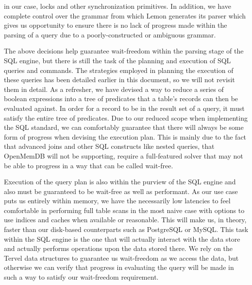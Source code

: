 \documentclass[letterpaper, 12pt]{article}
\begin{document}
  in our case, locks and other synchronization primitives. In addition, we have complete control over
  the grammar from which Lemon generates its parser which gives us opportunity to ensure there
  is no lack of progress made within the parsing of a query due to a poorly-constructed or ambiguous
  grammar.
  \par\vspace{\baselineskip}
  The above decisions help guarantee wait-freedom within the parsing stage of the SQL engine, but there
  is still the task of the planning and execution of SQL queries and commands. The strategies employed in
  planning the execution of these queries has been detailed earlier in this document, so we will not 
  revisit them in detail. As a refresher, we have devised a way to reduce a series of boolean expressions
  into a tree of predicates that a table's records can then be evaluated against. In order for a record
  to be in the result set of a query, it must satisfy the entire tree of predicates. Due to our reduced scope
  when implementing the SQL standard, we can comfortably guarantee that there will always be some form 
  of progress when devising the execution plan. This is mainly due to the fact that advanced joins and 
  other SQL constructs like nested queries, that OpenMemDB will not be supporting, require a full-featured 
  solver that may not be able to progress in a way that can be called wait-free.
  \par\vspace{\baselineskip}
  Execution of the query plan is also within the purview of the SQL engine and also must be guaranteed to be
  wait-free as well as performant. As our use case puts us entirely within memory, we have the necessarily low
  latencies to feel comfortable in performing full table scans in the most naive case with options to 
  use indices and caches when available or reasonable. This will make us, in theory, faster than our disk-based
  counterparts such as PostgreSQL or MySQL. This task within the SQL engine is the one that will actually
  interact with the data store and actually performs operations upon the data stored there. We rely on the Tervel
  data structures to guarantee us wait-freedom as we access the data, but otherwise we can verify that
  progress in evaluating the query will be made in such a way to satisfy our wait-freedom requirement.
  
\end{document}
